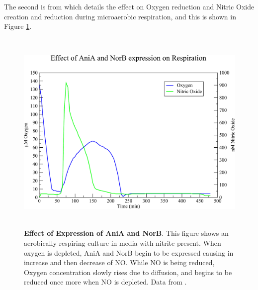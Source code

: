 The second is from \citet{Rock2005} which details the effect on Oxygen reduction and Nitric Oxide creation and reduction during microaerobic respiration, and this is shown in Figure \ref{fig:expression}.
\begin{figure}[tbp]
 \centering
 \includegraphics[height=10cm]{./08-expression/data/expression.pdf}
 \caption[Effect of Expression of AniA and NorB]{{\bf Effect of Expression of AniA and NorB}. This figure shows an aerobically respiring culture in media with nitrite present. When oxygen is depleted, AniA and NorB begin to be expressed causing in increase and then decrease of NO. While NO is being reduced, Oxygen concentration slowly rises due to diffusion, and begins to be reduced once more when NO is depleted. Data from \citet{Rock2005}.
 \label{fig:expression}}
\end{figure}